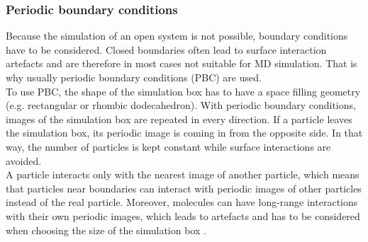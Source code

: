 \subsubsection{Periodic boundary conditions}
\label{subsec:pbc}
Because the simulation of an open system is not possible, boundary conditions have to be considered. Closed boundaries often lead to surface interaction artefacts and are therefore in most cases not suitable for MD simulation. That is why usually periodic boundary conditions (PBC) are used.\\
To use PBC, the shape of the simulation box has to have a space filling geometry (e.g. rectangular or rhombic dodecahedron). With periodic boundary conditions, images of the simulation box are repeated in every direction. If a particle leaves the simulation box, its periodic image is coming in from the opposite side. In that way, the number of particles is kept constant while surface interactions are avoided.\\
A particle interacts only with the nearest image of another particle, which means that particles near boundaries can interact with periodic images of other particles instead of the real particle. Moreover, molecules can have long-range interactions with their own periodic images, which leads to artefacts and has to be considered when choosing the size of the simulation box \autocite[p. 141-142]{greenBook}.
